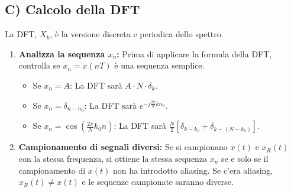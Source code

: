 \subsection{C) Calcolo della DFT}
La DFT, $X_k$, è la versione discreta e periodica dello spettro.
\begin{enumerate}
    \item \textbf{Analizza la sequenza $x_n$:} Prima di applicare la formula della DFT, controlla se $x_n = x(nT)$ è una sequenza semplice.
    \begin{itemize}
        \item Se $x_n = A$: La DFT sarà $A \cdot N \cdot \delta_k$.
        \item Se $x_n = \delta_{n-n_0}$: La DFT sarà $e^{-j\frac{2\pi}{N}kn_0}$.
        \item Se $x_n = \cos(\frac{2\pi}{N}k_0 n)$: La DFT sarà $\frac{N}{2}[\delta_{k-k_0} + \delta_{k-(N-k_0)}]$.
    \end{itemize}
    \item \textbf{Campionamento di segnali diversi:} Se si campionano $x(t)$ e $x_R(t)$ con la stessa frequenza, si ottiene la stessa sequenza $x_n$ se e solo se il campionamento di $x(t)$ non ha introdotto aliasing. Se c'era aliasing, $x_R(t) \neq x(t)$ e le sequenze campionate saranno diverse.
\end{enumerate}